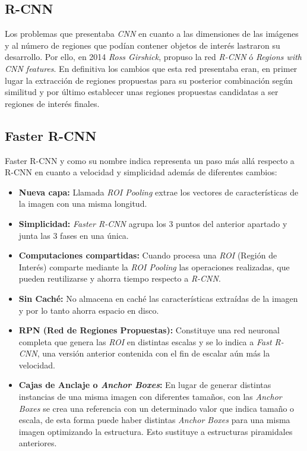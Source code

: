 \subsection{R-CNN}
Los problemas que presentaba \emph{CNN} en cuanto a las dimensiones de las imágenes y al número de regiones que podían contener objetos de interés lastraron su desarrollo.
Por ello, en 2014 \emph{Ross Girshick}, propuso la red \emph{R-CNN} ó \emph{Regions with CNN features}. En definitiva los cambios que esta red presentaba eran, en primer lugar la extracción de regiones propuestas para su posterior combinación según similitud y por último establecer unas regiones propuestas candidatas a ser regiones de interés finales.\cite{R-CNN:article}

\subsection{Faster R-CNN}
Faster R-CNN y como su nombre indica representa un paso más allá respecto a R-CNN en cuanto a velocidad y simplicidad además de diferentes cambios: 

\begin{itemize}
    \item \textbf{Nueva capa:} Llamada \emph{ROI Pooling} extrae los vectores de características de la imagen con una misma longitud.
    \item \textbf{Simplicidad:} \emph{Faster R-CNN} agrupa los 3 puntos del anterior apartado y junta las 3 fases en una única.
    \item \textbf{Computaciones compartidas:} Cuando procesa una \emph{ROI} (Región de Interés) comparte mediante la \emph{ROI Pooling} las operaciones realizadas, que pueden reutilizarse y ahorra tiempo respecto a \emph{R-CNN}.
    \item \textbf{Sin Caché:} No almacena en caché las características extraídas de la imagen y por lo tanto ahorra espacio en disco.
    \item \textbf{RPN (Red de Regiones Propuestas):} Constituye una red neuronal completa que genera las \emph{ROI} en distintas escalas y se lo indica a \emph{Fast R-CNN}, una versión anterior contenida con el fin de escalar aún más la velocidad.
    \item \textbf{Cajas de Anclaje o \emph{Anchor Boxes}:} En lugar de generar distintas instancias de una misma imagen con diferentes tamaños, con las \emph{Anchor Boxes} se crea una referencia con un determinado valor que indica tamaño o escala, de esta forma puede haber distintas \emph{Anchor Boxes} para una misma imagen optimizando la estructura. Esto sustituye a estructuras piramidales anteriores.

\end{itemize}


